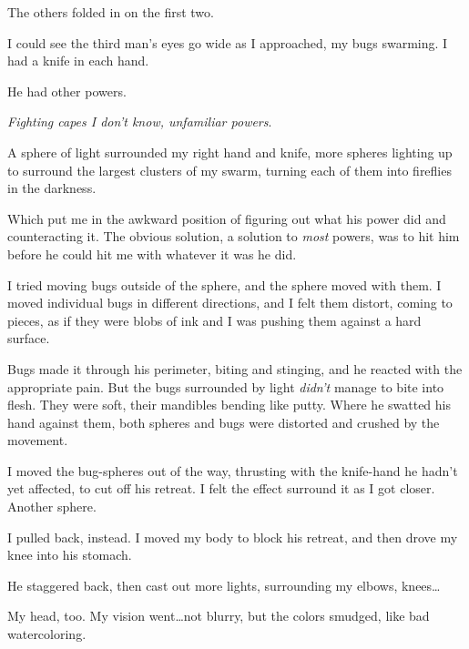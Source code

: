 The others folded in on the first two.



I could see the third man's eyes go wide as I approached, my bugs swarming.  I had a knife in each hand.



He had other powers.



\emph{Fighting capes I don't know, unfamiliar powers}.



A sphere of light surrounded my right hand and knife, more spheres lighting up to surround the largest clusters of my swarm, turning each of them into fireflies in the darkness.



Which put me in the awkward position of figuring out what his power did and counteracting it.  The obvious solution, a solution to \emph{most} powers, was to hit him before he could hit me with whatever it was he did.



I tried moving bugs outside of the sphere, and the sphere moved with them.  I moved individual bugs in different directions, and I felt them distort, coming to pieces, as if they were blobs of ink and I was pushing them against a hard surface.



Bugs made it through his perimeter, biting and stinging, and he reacted with the appropriate pain.  But the bugs surrounded by light \emph{didn't} manage to bite into flesh.  They were soft, their mandibles bending like putty.  Where he swatted his hand against them, both spheres and bugs were distorted and crushed by the movement.



I moved the bug-spheres out of the way, thrusting with the knife-hand he hadn't yet affected, to cut off his retreat.  I felt the effect surround it as I got closer.  Another sphere.



I pulled back, instead.  I moved my body to block his retreat, and then drove my knee into his stomach.



He staggered back, then cast out more lights, surrounding my elbows, knees\ldots



My head, too.  My vision went\ldots not blurry, but the colors smudged, like bad watercoloring.



